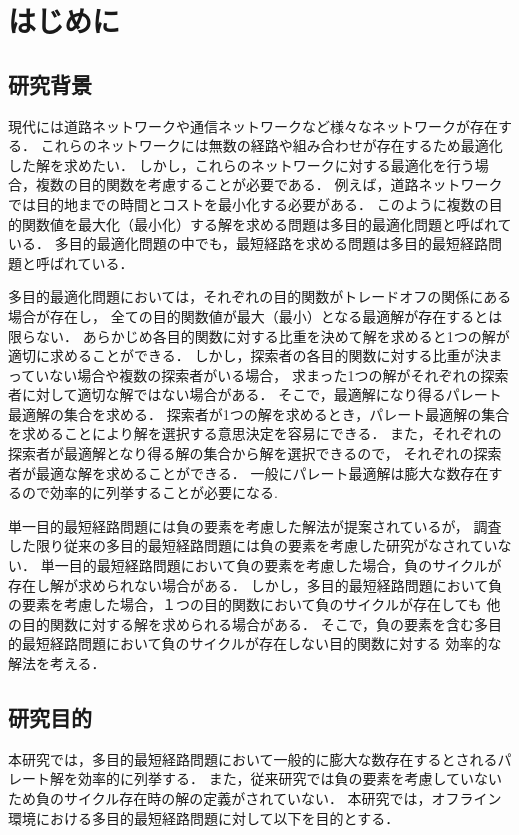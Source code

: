 \documentclass[12pt]{optlab-bachelor}
\begin{document}
\frontmatter %
\chapter{はじめに}
\section{研究背景}
現代には道路ネットワークや通信ネットワークなど様々なネットワークが存在する．
これらのネットワークには無数の経路や組み合わせが存在するため最適化した解を求めたい．
しかし，これらのネットワークに対する最適化を行う場合，複数の目的関数を考慮することが必要である．
例えば，道路ネットワークでは目的地までの時間とコストを最小化する必要がある．
このように複数の目的関数値を最大化（最小化）する解を求める問題は多目的最適化問題と呼ばれている．
多目的最適化問題の中でも，最短経路を求める問題は多目的最短経路問題と呼ばれている．

多目的最適化問題においては，それぞれの目的関数がトレードオフの関係にある場合が存在し，
全ての目的関数値が最大（最小）となる最適解が存在するとは限らない．
あらかじめ各目的関数に対する比重を決めて解を求めると1つの解が適切に求めることができる．
しかし，探索者の各目的関数に対する比重が決まっていない場合や複数の探索者がいる場合，
求まった1つの解がそれぞれの探索者に対して適切な解ではない場合がある．
そこで，最適解になり得るパレート最適解の集合を求める．
探索者が1つの解を求めるとき，パレート最適解の集合を求めることにより解を選択する意思決定を容易にできる．
また，それぞれの探索者が最適解となり得る解の集合から解を選択できるので，
それぞれの探索者が最適な解を求めることができる．
一般にパレート最適解は膨大な数存在するので効率的に列挙することが必要になる.

単一目的最短経路問題には負の要素を考慮した解法が提案されているが，
調査した限り従来の多目的最短経路問題には負の要素を考慮した研究がなされていない．
単一目的最短経路問題において負の要素を考慮した場合，負のサイクルが存在し解が求められない場合がある．
しかし，多目的最短経路問題において負の要素を考慮した場合，１つの目的関数において負のサイクルが存在しても
他の目的関数に対する解を求められる場合がある．
そこで，負の要素を含む多目的最短経路問題において負のサイクルが存在しない目的関数に対する
効率的な解法を考える．

\section{研究目的}
本研究では，多目的最短経路問題において一般的に膨大な数存在するとされるパレート解を効率的に列挙する．
また，従来研究では負の要素を考慮していないため負のサイクル存在時の解の定義がされていない．
本研究では，オフライン環境における多目的最短経路問題に対して以下を目的とする．
\end{document}
